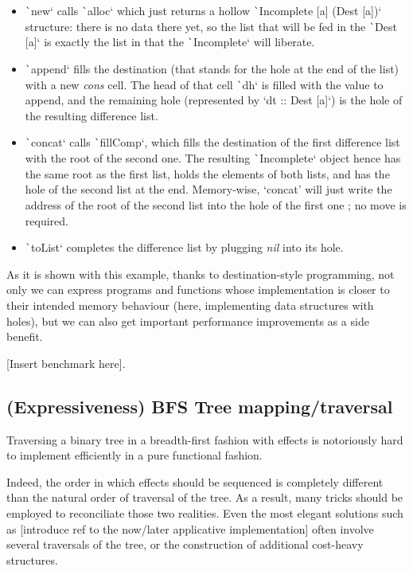 \documentclass[english]{jflart}
\begin{document}
\begin{itemize}
  \item \texttt`new` calls \texttt`alloc` which just returns a hollow \texttt`Incomplete [a] (Dest [a])` structure: there is no data there yet, so the list that will be fed in the \texttt`Dest [a]` is exactly the list in that the \texttt`Incomplete` will liberate.
  \item \texttt`append` fills the destination (that stands for the hole at the end of the list) with a new \emph{cons} cell. The head of that cell \texttt`dh` is filled with the value to append, and the remaining hole (represented by `dt :: Dest [a]`) is the hole of the resulting difference list.
  \item \texttt`concat` calls \texttt`fillComp`, which fills the destination of the first difference list with the root of the second one. The resulting \texttt`Incomplete` object hence has the same root as the first list, holds the elements of both lists, and has the hole of the second list at the end. Memory-wise, `concat' will just write the address of the root of the second list into the hole of the first one ; no move is required.
  \item \texttt`toList` completes the difference list by plugging \emph{nil} into its hole.
\end{itemize}

As it is shown with this example, thanks to destination-style programming, not only we can express programs and functions whose implementation is closer to their intended memory behaviour (here, implementing data structures with holes), but we can also get important performance improvements as a side benefit.

[Insert benchmark here].

\subsection{(Expressiveness) BFS Tree mapping/traversal}

Traversing a binary tree in a breadth-first fashion with effects is notoriously hard to implement efficiently in a pure functional fashion.

Indeed, the order in which effects should be sequenced is completely different than the natural order of traversal of the tree. As a result, many tricks should be employed to reconciliate those two realities. Even the most elegant solutions such as [introduce ref to the now/later applicative implementation] often involve several traversals of the tree, or the construction of additional cost-heavy structures. 
\end{document}
